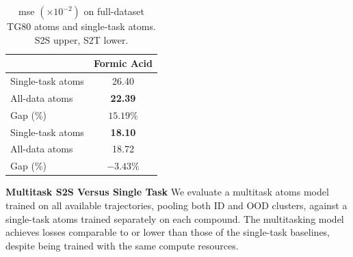 \begin{table}
    \centering
    \caption{\gls{mse} \((\times10^{-2})\) on full-dataset TG80 \gls{atoms} and single-task \gls{atoms}. S2S upper, S2T lower.}
    \begin{tabular}{lc}
        \toprule
        & Formic Acid \\
        \midrule
        Single-task \gls{atoms} & 26.40 \\
        All-data \gls{atoms} & \textbf{22.39} \\
        \midrule
        \rowcolor{gray!20} Gap (\%) & \(15.19\%\) \\
        \midrule
        Single-task \gls{atoms} & \textbf{18.10} \\
        All-data \gls{atoms} & 18.72 \\
        \midrule
        \rowcolor{gray!20} Gap (\%) & \(-3.43\%\) \\
        \bottomrule
    \end{tabular}
    \label{tab:placeholder}
    \vspace{-0.5\baselineskip}
\end{table}
\textbf{Multitask S2S Versus Single Task} We evaluate a multitask \gls{atoms} model trained on all available trajectories, pooling both ID and OOD clusters, against a single-task \gls{atoms} trained separately on each compound. The multitasking model achieves losses comparable to or lower than those of the single-task baselines, despite being trained with the same compute resources.


